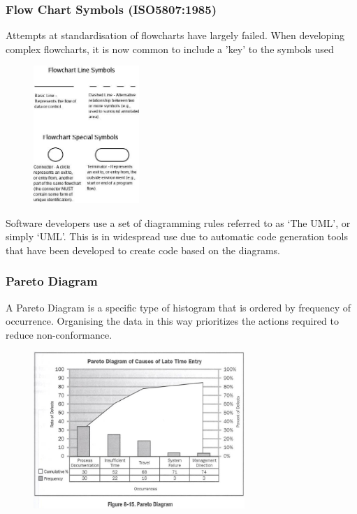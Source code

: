 \begin{frame}
\frametitle{Flow Chart Symbols  (ISO5807:1985) }
Attempts at standardisation of flowcharts have largely failed.
When developing complex flowcharts, it is now common to include a 'key' to the symbols used
\begin{figure}
	\centering
		\includegraphics[width = 4cm]{images/flow3.jpg}
	\label{fig:flow3}
\end{figure}
\end{frame}

Software developers use a set of diagramming rules referred to as `The UML', or simply `UML'.  This is in widespread use due to automatic code generation tools that have been developed to create code based on the diagrams.


\begin{frame}
\frametitle{Pareto Diagram}
A Pareto Diagram is a specific type of histogram that is ordered by frequency of occurrence.
Organising the data in this way prioritizes the actions required to reduce non-conformance.
\begin{figure}
	\centering
		\includegraphics[width = 8cm]{images/pareto.jpg}
	\label{fig:pareto}
\end{figure}

\end{frame}




